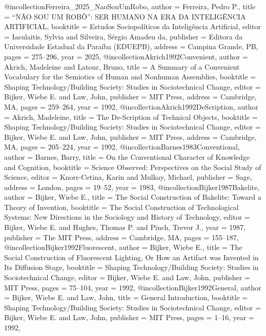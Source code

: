 @incollection{Ferreira_2025_NaoSouUmRobo,
  author    = {Ferreira, Pedro P.},
  title     = {“NÃO SOU UM ROBÔ”: SER HUMANO NA ERA DA INTELIGÊNCIA ARTIFICIAL},
  booktitle = {Estudos Sociopolíticos da Inteligência Artificial},
  editor    = {Iasulaitis, Sylvia and Silveira, Sérgio Amadeu da},
  publisher = {Editora da Universidade Estadual da Paraíba (EDUEPB)},
  address   = {Campina Grande, PB},
  pages     = {275--296},
  year      = {2025},
}
@incollection{Akrich1992Convenient,
  author    = {Akrich, Madeleine and Latour, Bruno},
  title     = {{A Summary of a Convenient Vocabulary for the Semiotics of Human and Nonhuman Assemblies}},
  booktitle = {{Shaping Technology/Building Society: Studies in Sociotechnical Change}},
  editor    = {Bijker, Wiebe E. and Law, John},
  publisher = {MIT Press},
  address   = {Cambridge, MA},
  pages     = {259--264},
  year      = {1992},
}
@incollection{Akrich1992DeScription,
  author    = {Akrich, Madeleine},
  title     = {{The De-Scription of Technical Objects}},
  booktitle = {{Shaping Technology/Building Society: Studies in Sociotechnical Change}},
  editor    = {Bijker, Wiebe E. and Law, John},
  publisher = {MIT Press},
  address   = {Cambridge, MA},
  pages     = {205--224},
  year      = {1992},
}
@incollection{Barnes1983Conventional,
  author    = {Barnes, Barry},
  title     = {{On the Conventional Character of Knowledge and Cognition}},
  booktitle = {{Science Observed: Perspectives on the Social Study of Science}},
  editor    = {Knorr-Cetina, Karin and Mulkay, Michael},
  publisher = {Sage},
  address   = {London},
  pages     = {19--52},
  year      = {1983},
}
@incollection{Bijker1987Bakelite,
  author    = {Bijker, Wiebe E.},
  title     = {{The Social Construction of Bakelite: Toward a Theory of Invention}},
  booktitle = {{The Social Construction of Technological Systems: New Directions in the Sociology and History of Technology}},
  editor    = {Bijker, Wiebe E. and Hughes, Thomas P. and Pinch, Trevor J.},
  year      = {1987},
  publisher = {The MIT Press},
  address   = {Cambridge, MA},
  pages     = {155--187},
}
@incollection{Bijker1992Fluorescent,
  author    = {Bijker, Wiebe E.},
  title     = {{The Social Construction of Fluorescent Lighting, Or How an Artifact was Invented in Its Diffusion Stage}},
  booktitle = {{Shaping Technology/Building Society: Studies in Sociotechnical Change}},
  editor    = {Bijker, Wiebe E. and Law, John},
  publisher = {MIT Press},
  pages     = {75--104},
  year      = {1992},
}
@incollection{Bijker1992General,
  author    = {Bijker, Wiebe E. and Law, John},
  title     = {{General Introduction}},
  booktitle = {{Shaping Technology/Building Society: Studies in Sociotechnical Change}},
  editor    = {Bijker, Wiebe E. and Law, John},
  publisher = {MIT Press},
  pages     = {1--16},
  year      = {1992},
}
